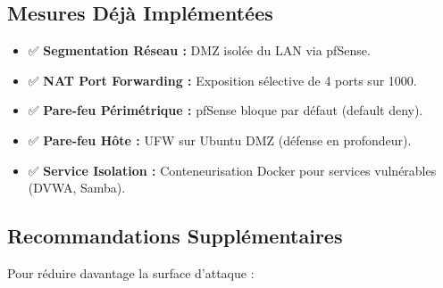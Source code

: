 \documentclass[12pt,a4paper,openany]{report}
\begin{document}
	\subsection{Mesures Déjà Implémentées}
	\begin{itemize}
		\item ✅ \textbf{Segmentation Réseau :} DMZ isolée du LAN via pfSense.
		\item ✅ \textbf{NAT Port Forwarding :} Exposition sélective de 4 ports sur 1000.
		\item ✅ \textbf{Pare-feu Périmétrique :} pfSense bloque par défaut (default deny).
		\item ✅ \textbf{Pare-feu Hôte :} UFW sur Ubuntu DMZ (défense en profondeur).
		\item ✅ \textbf{Service Isolation :} Conteneurisation Docker pour services vulnérables (DVWA, Samba).
	\end{itemize}
	
	\subsection{Recommandations Supplémentaires}
	Pour réduire davantage la surface d'attaque :
	
\end{document}
